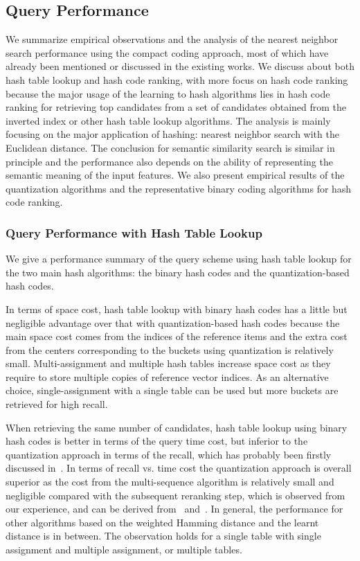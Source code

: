 \documentclass[10pt,journal,compsoc]{IEEEtran}
\begin{document}
\subsection{Query Performance}
We summarize empirical observations and the analysis
of the nearest neighbor search performance
using the compact coding approach,
most of which have already been mentioned
or discussed in the existing works.
We discuss about both hash table lookup
and hash code ranking,
with more focus on hash code ranking
because the major usage of
the learning to hash algorithms
lies in hash code ranking
for retrieving top candidates
from a set of candidates
obtained from the inverted index
or other hash table lookup algorithms.
The analysis is mainly focusing on
the major application of hashing:
nearest neighbor search with the Euclidean distance.
The conclusion for semantic similarity search
is similar in principle
and the performance also depends on the ability
of representing the semantic meaning
of the input features.
We also present empirical results
of the quantization algorithms
and the representative binary coding algorithms
for hash code ranking.


\subsubsection{Query Performance with Hash Table Lookup}
We give a performance summary
of the query scheme using hash table lookup
for the two main hash algorithms:
the binary hash codes
and the quantization-based hash codes.

In terms of space cost,
hash table lookup with binary hash codes
has a little but negligible advantage
over that with quantization-based hash codes
because the main space cost comes from the indices of the reference items
and the extra cost from the centers
corresponding to the buckets
using quantization
is relatively small.
Multi-assignment and multiple hash tables
increase space cost
as they require to store multiple copies of reference vector indices.
As an alternative choice,
single-assignment with a single table can be used
but more buckets are retrieved
for high recall.


When retrieving the same number of candidates,
hash table lookup using binary hash codes
is better in terms of the query time cost,
but inferior to the quantization approach
in terms of the recall,
which has probably been firstly discussed in~\cite{PauleveJA10}.
In terms of recall vs. time cost
the quantization approach is overall superior
as the cost from the multi-sequence algorithm is relatively small and negligible
compared with the subsequent reranking step,
which is observed from our experience,
and can be derived from~\cite{MujaL09} and~\cite{BabenkoL12}.
In general,
the performance for other algorithms based on the weighted Hamming distance and the learnt distance
is in between.
The observation holds
for a single table
with single assignment and
multiple assignment,
or multiple tables.
\end{document}
